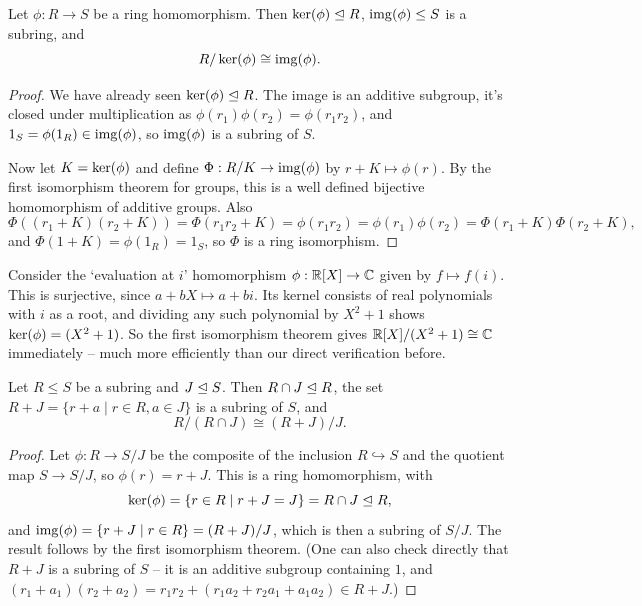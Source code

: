 \documentclass[a4paper]{scrartcl}
\begin{document}
\begin{theorem}
	Let $\phi: R \rightarrow S$ be a ring homomorphism. Then $\operatorname{ker} (\phi) \trianglelefteq R$, $\operatorname{img}(\phi) \leq S$ is a subring, and
	$$
	R/\operatorname{ker}(\phi) \cong \operatorname{img}(\phi).
	$$
\end{theorem}
\begin{proof}
	We have already seen $\operatorname{ker}(\phi) \trianglelefteq R$. The image is an additive subgroup, it's closed under multiplication as $\phi(r_1)\phi(r_2) = \phi(r_1 r_2)$, and $1_S = \phi(1_R) \in \operatorname{img}(\phi)$, so $\operatorname{img}(\phi)$ is a subring of $S$.

	Now let $K = \operatorname{ker}(\phi)$ and define $\Phi: R/K \rightarrow \operatorname{img}(\phi)$ by $r + K \mapsto \phi(r)$. By the first isomorphism theorem for groups, this is a well defined bijective homomorphism of additive groups. Also
	$$
	\Phi((r_1 + K)(r_2 + K)) = \Phi(r_1 r_2 + K) = \phi(r_1 r_2) = \phi(r_1)\phi(r_2) = \Phi(r_1 + K) \Phi(r_2 + K),
	$$
	and $\Phi(1 + K) = \phi(1_R) = 1_S$, so $\Phi$ is a ring isomorphism.
\end{proof}

\begin{example}
	Consider the `evaluation at $i$' homomorphism $\phi: \mathbb{R}[X] \rightarrow \mathbb{C}$ given by $f \mapsto f(i)$. This is surjective, since $a + bX \mapsto a + bi$. Its kernel consists of real polynomials with $i$ as a root, and dividing any such polynomial by $X^2 + 1$ shows $\operatorname{ker}(\phi) = (X^2 + 1)$. So the first isomorphism theorem gives $\mathbb{R}[X]/(X^2 + 1) \cong \mathbb{C}$ immediately -- much more efficiently than our direct verification before.
\end{example}

\begin{theorem}
	Let $R \leq S$ be a subring and $J \trianglelefteq S$. Then $R \cap J \trianglelefteq R$, the set $R + J = \{r + a \mid r \in R, a \in J\}$ is a subring of $S$, and
	$$
	R/(R \cap J) \cong (R + J)/J.
	$$
\end{theorem}
\begin{proof}
	Let $\phi: R \rightarrow S/J$ be the composite of the inclusion $R \hookrightarrow S$ and the quotient map $S \rightarrow S/J$, so $\phi(r) = r + J$. This is a ring homomorphism, with
	$$
	\operatorname{ker}(\phi) = \{r \in R \mid r + J = J\} = R \cap J \trianglelefteq R,
	$$
	and $\operatorname{img}(\phi) = \{r + J \mid r \in R\} = (R + J)/J$, which is then a subring of $S/J$. The result follows by the first isomorphism theorem. (One can also check directly that $R + J$ is a subring of $S$ -- it is an additive subgroup containing $1$, and $(r_1 + a_1)(r_2 + a_2) = r_1 r_2 + (r_1 a_2 + r_2 a_1 + a_1 a_2) \in R + J$.)
\end{proof}
\end{document}
